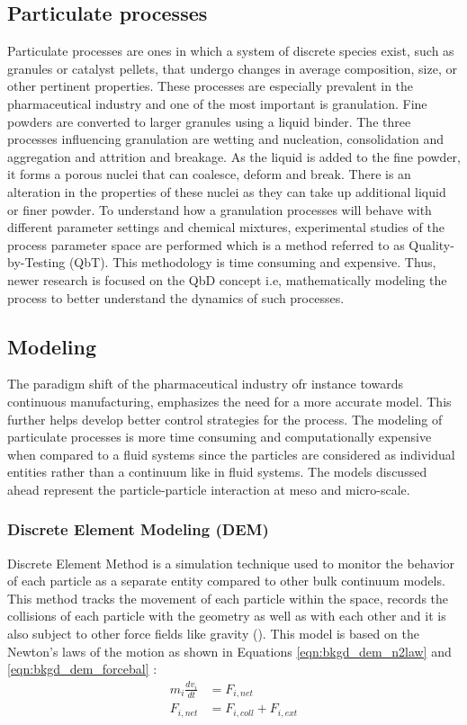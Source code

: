 \documentclass[preprint,11pt,authoryear]{elsarticle}
\begin{document}
\subsection{Particulate processes}
Particulate processes are ones in which a system of discrete species exist, such as granules 
or catalyst pellets, that undergo changes in average composition, size, or other pertinent 
properties. These processes are especially prevalent in the pharmaceutical industry and one of the 
most important is granulation. 
Fine powders are converted to larger granules using a liquid binder. The three processes 
influencing granulation are wetting and nucleation, consolidation and aggregation and attrition and 
breakage\citep{Iveson2001}\citep{Cameron2005}. As the liquid is added to the fine powder, it 
forms a porous nuclei that can coalesce, deform and break\citep{Barrasso2015ces}. There is an 
alteration in the properties of these nuclei as they can take up additional liquid or finer powder.
To understand how a granulation processes will behave with different parameter settings and 
chemical mixtures, experimental studies of the process parameter space are performed which is a 
method referred to as Quality-by-Testing (QbT). This methodology is time consuming and 
expensive. Thus, newer research is focused on the QbD concept i.e, 
mathematically modeling the process to better understand the dynamics of such processes.

\subsection{Modeling}
The paradigm shift of the pharmaceutical industry ofr instance towards continuous manufacturing, 
emphasizes the need for a more accurate model. This further helps develop better control strategies 
for the process. The modeling of particulate processes is more time consuming and computationally 
expensive when compared to a fluid systems since the particles are considered as individual entities 
rather than a continuum like in fluid systems. The models discussed ahead represent the 
particle-particle interaction at meso and micro-scale.
\subsubsection{Discrete Element Modeling (DEM)}
 Discrete Element Method is a simulation technique used to monitor the behavior of each particle 
as a separate entity compared to other bulk continuum models. This method tracks the movement of 
each particle within the space, records the collisions of each particle with the geometry as well 
as with each other and it is also subject to other force fields like gravity (\cite{Barrasso2015cerd}). This 
model is based on the Newton's laws of the motion as shown in Equations 
\ref{eqn:bkgd_dem_n2law} and  \ref{eqn:bkgd_dem_forcebal} : \\
\begin{align}
m_i\frac{dv_i}{dt} &= F_{i,net} \label{eqn:bkgd_dem_n2law} \\
F_{i,net} &=  F_{i,coll} +  F_{i,ext} \label{eqn:bkgd_dem_forcebal}
\end{align}
\end{document}
